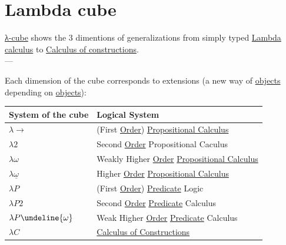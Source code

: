 \documentclass[a4paper,14pt,oneside]{book}
\begin{document}
\section{\label{orgf62b7f9}Lambda cube}
\label{sec:orgee2dc8a}
\hyperref[org73543d8]{λ-cube} shows the 3 dimentions of generalizations from simply typed \hyperref[orgba427a3]{Lambda calculus} to \hyperref[org105f7b6]{Calculus of constructions}.\\

---\\


Each dimension of the cube corresponds to extensions (a new way of \hyperref[org396ff03]{objects} depending on \hyperref[org396ff03]{objects}):\\

\begin{center}
\begin{tabular}{ll}
System of the cube & Logical System\\
\hline
\(\lambda\to\) & (First \hyperref[org040bf73]{Order}) \hyperref[org10ca547]{Propositional Calculus}\\
\(\lambda2\) & Second \hyperref[org040bf73]{Order} Propositional Caculus\\
\(\lambda\omega\) & Weakly Higher \hyperref[org040bf73]{Order} \hyperref[org10ca547]{Propositional Calculus}\\
\(\lambda \underline{\omega}\) & Higher \hyperref[org040bf73]{Order} \hyperref[org10ca547]{Propositional Calculus}\\
\(\lambda P\) & (First \hyperref[org040bf73]{Order}) \hyperref[orgd3e7349]{Predicate} Logic\\
\(\lambda P 2\) & Second \hyperref[org040bf73]{Order} \hyperref[orgd3e7349]{Predicate} Calculus\\
\(\lambda P \undeline{\omega}\) & Weak Higher \hyperref[org040bf73]{Order} \hyperref[orgd3e7349]{Predicate} Calculus\\
\(\lambda C\) & \hyperref[org105f7b6]{Calculus of Constructions}\\
\end{tabular}
\end{center}
\end{document}
